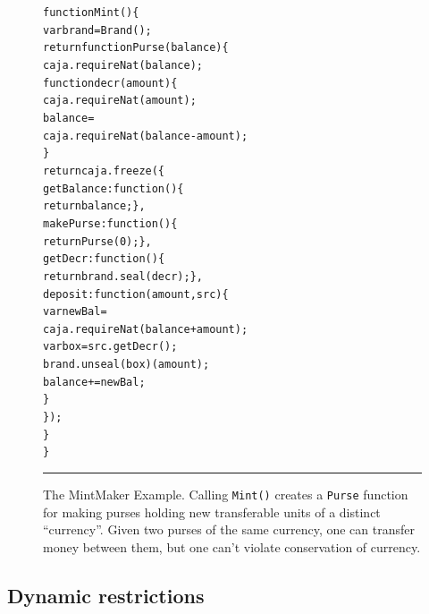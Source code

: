 \documentclass[letterpaper,twocolumn,10pt]{article}
\newcommand{\code}[1]{{\tt {#1}}}              %
\begin{document}
\begin{figure}[t!]
\begin{alltt}
function Mint() \{
  var brand = Brand();
  return function Purse(balance) \{
    caja.requireNat(balance);
    function decr(amount) \{
      caja.requireNat(amount);
      balance = 
        caja.requireNat(balance - amount);
    \}
    return caja.freeze(\{
      getBalance: function() \{
        return balance; \},
      makePurse:  function() \{
        return Purse(0); \},
      getDecr:    function() \{
        return brand.seal(decr); \},
      deposit: function(amount,src) \{
        var newBal = 
          caja.requireNat(balance+amount);
        var box = src.getDecr();
        brand.unseal(box)(amount);
        balance += newBal;
      \}
    \});
  \}
\}
\end{alltt}

\caption[The MintMaker Example]{The MintMaker Example. Calling \code{Mint()} 
creates a \code{Purse} function for making purses holding new transferable 
units of a distinct ``currency''. Given two purses of the same currency, one 
can transfer money between them, but one can't violate conservation of 
currency. \\ } \hrule
\label{fig:mintmaker}
\end{figure}



\subsection{Dynamic restrictions}
\end{document}
